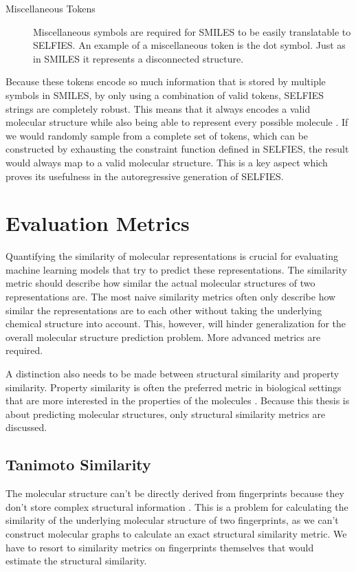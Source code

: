 \begin{description}
    \item[Miscellaneous Tokens] Miscellaneous symbols are required for SMILES to be easily translatable to SELFIES. An example of a miscellaneous token is the dot symbol. Just as in SMILES it represents a disconnected structure.
    
\end{description}

Because these tokens encode so much information that is stored by multiple symbols in SMILES, by only using a combination of valid tokens, SELFIES strings are completely robust. This means that it always encodes a valid molecular structure while also being able to represent every possible molecule \cite{lo2023recent}. If we would randomly sample from a complete set of tokens, which can be constructed by exhausting the constraint function defined in SELFIES, the result would always map to a valid molecular structure. This is a key aspect which proves its usefulness in the autoregressive generation of SELFIES.

\section{Evaluation Metrics}
\label{sec:evalmetrics}

Quantifying the similarity of molecular representations is crucial for evaluating machine learning models that try to predict these representations. The similarity metric should describe how similar the actual molecular structures of two representations are. The most naive similarity metrics often only describe how similar the representations are to each other without taking the underlying chemical structure into account. This, however, will hinder generalization for the overall molecular structure prediction problem. More advanced metrics are required.

A distinction also needs to be made between structural similarity and property similarity. Property similarity is often the preferred metric in biological settings that are more interested in the properties of the molecules \cite{safizadeh2021improving}. Because this thesis is about predicting molecular structures, only structural similarity metrics are discussed.

\subsection{Tanimoto Similarity}
The molecular structure can't be directly derived from fingerprints because they don't store complex structural information \cite{kretschmer2023small}. This is a problem for calculating the similarity of the underlying molecular structure of two fingerprints, as we can't construct molecular graphs to calculate an exact structural similarity metric. We have to resort to similarity metrics on fingerprints themselves that would estimate the structural similarity.

